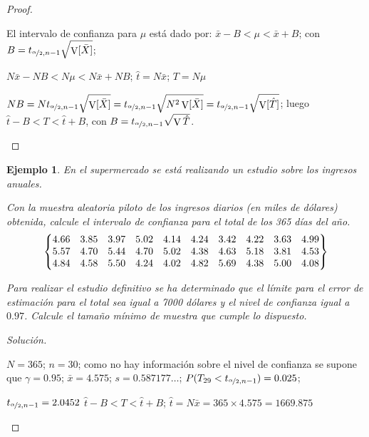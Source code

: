 \documentclass[a5paper,doc,10pt,noapacite]{apa6}
\DeclareMathOperator{\Var}{V}
\newtheorem{ejem}{Ejemplo}
\begin{document}
{{\begin{proof}
\begin{APAenumerate}
		\vspace{1\baselineskip}
		\item El intervalo de confianza para \(\mu\) está dado por: \(\bar{x}-B<\mu<\bar{x}+B\); con \(B=t_{\nicefrac{\alpha}{2},n-1}\sqrt{\Var[\bar{X}]}\);
		
		\(N\bar{x}-NB<N\mu<N\bar{x}+NB\); \(\hat{t}=N\bar{x}\); \(T=N\mu\)
		
		\(NB=Nt_{\nicefrac{\alpha}{2},n-1}\sqrt{\Var[\bar{X}]}=t_{\nicefrac{\alpha}{2},n-1}\sqrt{N^2\Var[\bar{X}]}=t_{\nicefrac{\alpha}{2},n-1}\sqrt{\Var[\hat{T}]}\); luego \(\hat{t}-B<T<\hat{t}+B\), con \(B=t_{\nicefrac{\alpha}{2},n-1}\sqrt{\Var\hat{T}}\).									\qedhere
	\end{APAenumerate}
\end{proof}


\begin{ejem}\label{ejem-5.7}
	En el supermercado se está realizando un estudio sobre los ingresos anuales.
	\begin{APAenumerate}
		\item Con la muestra aleatoria piloto de los ingresos diarios (en miles de dólares) obtenida, calcule el intervalo de confianza para el total de los 365 días del año.
		\[\setcounter{MaxMatrixCols}{20}
		\begin{Bmatrix}
	4.66 & 3.85 & 3.97 & 5.02 & 4.14 & 4.24 & 3.42 & 4.22& 3.63 & 4.99  \\
	5.57 & 4.70 & 5.44 & 4.70 & 5.02 & 4.38 & 4.63 & 5.18 & 3.81 & 4.53 \\
	4.84 & 4.58 & 5.50 & 4.24 & 4.02 & 4.82 & 5.69 & 4.38 & 5.00 & 4.08
	\end{Bmatrix}\]

\item Para realizar el estudio definitivo se ha determinado que el límite para el error de estimación para el total sea igual a 7000 dólares y el nivel de confianza igual a \(0.97\). Calcule el tamaño mínimo de muestra que cumple lo dispuesto.
	\end{APAenumerate}
\end{ejem}
\begin{proof}[Solución]\quad
	\begin{APAenumerate}
		\item \(N=365\); \(n=30\); como no hay información sobre el nivel de confianza se supone que \(\gamma=0.95\); \(\bar{x}=4.575\); \(s=0.587177\ldots\); \(P(T_{29}<t_{\nicefrac{\alpha}{2},n-1})=0.025\); 
		
		\(t_{\nicefrac{\alpha}{2},n-1}=2.0452\) \(\hat{t}-B<T<\hat{t}+B\); \(\hat{t}=N\bar{x}=365 \times 4.575=1669.875\)
		

\end{APAenumerate}
\end{proof}}}
\end{document}
